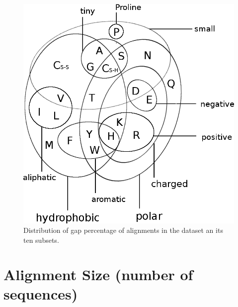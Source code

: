 \documentclass[12pt,a4paper,twoside]{book}
\theoremstyle{definition}
\theoremstyle{definition}
\theoremstyle{remark}
\begin{document}
\begin{figure}
\includegraphics[width=1\linewidth]{img/amino_acid_physico_chemical_properties_venn_diagramm} \caption{Distribution of gap percentage of alignments in the
dataset an its ten subsets.}\label{fig:dataset-gaps}
\end{figure}

\section{Alignment Size (number of
sequences)}\label{alignment-size-number-of-sequences}
\end{document}
